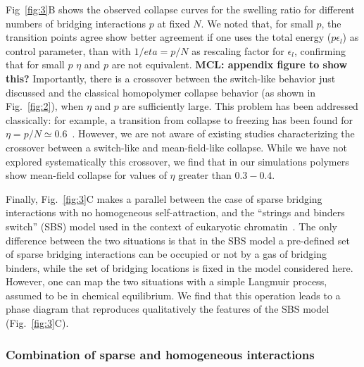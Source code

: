 \documentclass[
preprint,
a4paper,
12pt,
superscriptaddress,
pre]{revtex4}
\begin{document}
%
Fig~\ref{fig:3}B shows the observed collapse curves for the swelling
ratio for different numbers of bridging interactions $p$ at fixed
$N$. 
%
We noted that, for small $p$, the transition points agree show better
agreement if one uses the total energy ($p \epsilon_l$) as control
parameter, than with $1/eta=p/N$ as rescaling factor for $\epsilon_l$,
confirming that for small $p$ $\eta$ and $p$ are not equivalent.
\textbf{MCL: appendix figure to show this?}
%
Importantly, there is a crossover between the switch-like behavior
just discussed and the classical homopolymer collapse behavior (as
shown in Fig.~\ref{fig:2}), when $\eta$ and $p$ are sufficiently large. This
problem has been addressed classically: for example, a transition from
collapse to freezing has been found for $\eta = p/N \simeq
0.6$~\cite{Camacho1997}. However, we are not aware of existing studies
characterizing the crossover between a switch-like and mean-field-like
collapse. While we have not explored systematically this crossover, we
find that in our simulations polymers show mean-field collapse for
values of $\eta$ greater than $0.3-0.4$.
%
%



Finally, Fig.~\ref{fig:3}C makes a parallel between the case of
sparse bridging interactions with no homogeneous self-attraction, and
the ``strings and binders switch'' (SBS) model used in the context of
eukaryotic chromatin~\cite{Barbieri2012,Barbieri2013b}.
The only difference between the two situations is that in the SBS
model a pre-defined set of sparse bridging interactions can be
occupied or not by a gas of bridging binders, while the set of
bridging locations is fixed in the model considered here. However, one
can map the two situations with a simple Langmuir process, assumed to
be in chemical equilibrium. We find that this operation leads to a
phase diagram that reproduces qualitatively the features of the SBS
model (Fig.~\ref{fig:3}C).



\subsubsection*{Combination of sparse and homogeneous interactions} 
\end{document}
